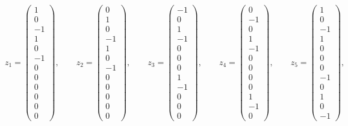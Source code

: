 \[
z_1=\begin{pmatrix} 1\\0\\-1\\1\\0\\-1\\0\\0\\0\\0\\0\\0\end{pmatrix},\qquad
z_2=\begin{pmatrix} 0\\1\\ 0\\-1\\1\\0\\-1\\0\\0\\0\\0\\0\end{pmatrix},\qquad
z_3=\begin{pmatrix} -1\\0\\1\\-1\\0\\0\\0\\1\\-1\\0\\0\\0\end{pmatrix},\qquad
z_4=\begin{pmatrix} 0\\-1\\0\\1\\-1\\0\\0\\0\\0\\1\\-1\\0\end{pmatrix},\qquad
z_5=\begin{pmatrix} 1\\0\\-1\\1\\0\\0\\0\\-1\\0\\1\\0\\-1\end{pmatrix},\qquad
\]
